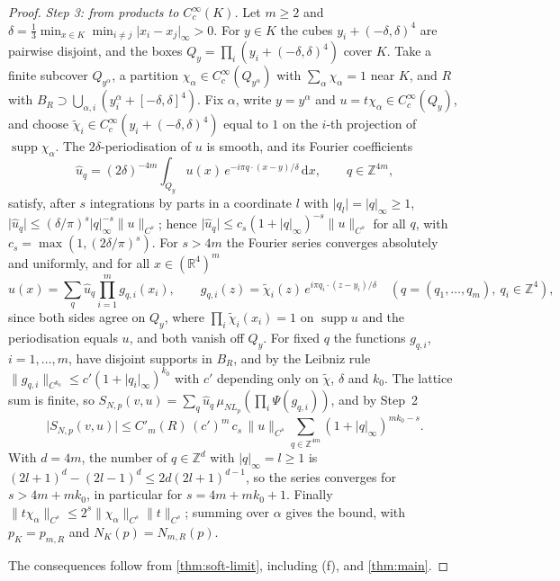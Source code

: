 \documentclass[11pt,a4paper]{amsart}
\theoremstyle{definition}
\theoremstyle{remark}
\numberwithin{equation}{section}
\newcommand{\R}{\mathbb{R}}          %
\newcommand{\Z}{\mathbb{Z}}          %
\newcommand{\norm}[1]{\lVert #1\rVert}     %
\newcommand{\abs}[1]{\lvert #1\rvert}      %
\newcommand{\dd}{\,\mathrm{d}}             %
\newcommand{\Lp}{L_p}                      %
\begin{document}
\begin{proof}
\emph{Step 3: from products to $C^\infty_c(K)$.} Let $m\ge2$ and $\delta=\frac13\min_{x\in K}\min_{i\ne j}\abs{x_i-x_j}_\infty>0$. For $y\in K$ the cubes $y_i+(-\delta,\delta)^4$ are pairwise disjoint, and the boxes $Q_y=\prod_i(y_i+(-\delta,\delta)^4)$ cover $K$. Take a finite subcover $Q_{y^\alpha}$, a partition $\chi_\alpha\in C^\infty_c(Q_{y^\alpha})$ with $\sum_\alpha\chi_\alpha=1$ near $K$, and $R$ with $B_R\supset\bigcup_{\alpha,i}(y^\alpha_i+[-\delta,\delta]^4)$. Fix $\alpha$, write $y=y^\alpha$ and $u=t\chi_\alpha\in C^\infty_c(Q_y)$, and choose $\tilde\chi_i\in C^\infty_c(y_i+(-\delta,\delta)^4)$ equal to $1$ on the $i$-th projection of $\operatorname{supp}\chi_\alpha$. The $2\delta$-periodisation of $u$ is smooth, and its Fourier coefficients
\[
\hat u_q=(2\delta)^{-4m}\int_{Q_y}u(x)\,e^{-i\pi q\cdot(x-y)/\delta}\dd x,\qquad q\in\Z^{4m},
\]
satisfy, after $s$ integrations by parts in a coordinate $l$ with $\abs{q_l}=\abs{q}_\infty\ge1$, $\abs{\hat u_q}\le(\delta/\pi)^s\abs{q}_\infty^{-s}\norm{u}_{C^s}$; hence $\abs{\hat u_q}\le c_s(1+\abs{q}_\infty)^{-s}\norm{u}_{C^s}$ for all $q$, with $c_s=\max(1,(2\delta/\pi)^s)$. For $s>4m$ the Fourier series converges absolutely and uniformly, and for all $x\in(\R^4)^m$
\[
u(x)=\sum_q\hat u_q\prod_{i=1}^mg_{q,i}(x_i),\qquad g_{q,i}(z)=\tilde\chi_i(z)\,e^{i\pi q_i\cdot(z-y_i)/\delta}\quad(q=(q_1,\dots,q_m),\ q_i\in\Z^4),
\]
since both sides agree on $Q_y$, where $\prod_i\tilde\chi_i(x_i)=1$ on $\operatorname{supp}u$ and the periodisation equals $u$, and both vanish off $Q_y$. For fixed $q$ the functions $g_{q,i}$, $i=1,\dots,m$, have disjoint supports in $B_R$, and by the Leibniz rule $\norm{g_{q,i}}_{C^{k_0}}\le c'(1+\abs{q_i}_\infty)^{k_0}$ with $c'$ depending only on $\tilde\chi$, $\delta$ and $k_0$. The lattice sum is finite, so $S_{N,p}(v,u)=\sum_q\hat u_q\,\mu_{N\Lp}(\prod_i\Psi(g_{q,i}))$, and by Step~2
\[
\abs{S_{N,p}(v,u)}\le C'_m(R)\,(c')^m\,c_s\,\norm{u}_{C^s}\sum_{q\in\Z^{4m}}(1+\abs{q}_\infty)^{mk_0-s}.
\]
With $d=4m$, the number of $q\in\Z^d$ with $\abs{q}_\infty=l\ge1$ is $(2l+1)^d-(2l-1)^d\le2d(2l+1)^{d-1}$, so the series converges for $s>4m+mk_0$, in particular for $s=4m+mk_0+1$. Finally $\norm{t\chi_\alpha}_{C^s}\le2^s\norm{\chi_\alpha}_{C^s}\norm{t}_{C^s}$; summing over $\alpha$ gives the bound, with $p_K=p_{m,R}$ and $N_K(p)=N_{m,R}(p)$.

The consequences follow from \cref{thm:soft-limit}, including (f), and \cref{thm:main}.
\end{proof}
\end{document}
